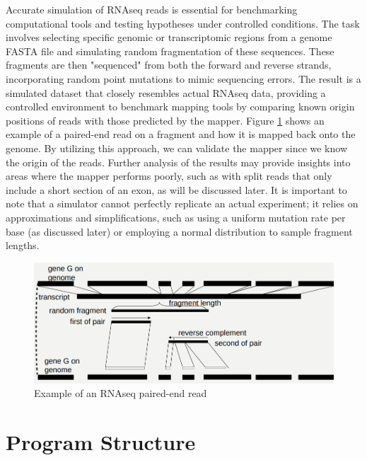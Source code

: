 \documentclass{article}
\begin{document}
    Accurate simulation of RNAseq reads is essential for benchmarking computational tools and testing hypotheses under controlled conditions. The task involves selecting specific genomic or transcriptomic regions from a genome FASTA file and simulating random fragmentation of these sequences. These fragments are then "sequenced" from both the forward and reverse strands, incorporating random point mutations to mimic sequencing errors. The result is a simulated dataset that closely resembles actual RNAseq data, providing a controlled environment to benchmark mapping tools by comparing known origin positions of reads with those predicted by the mapper. Figure \ref{fig:read-diagraml} shows an example of a paired-end read on a fragment and how it is mapped back onto the genome. By utilizing this approach, we can validate the mapper since we know the origin of the reads. Further analysis of the results may provide insights into areas where the mapper performs poorly, such as with split reads that only include a short section of an exon, as will be discussed later. It is important to note that a simulator cannot perfectly replicate an actual experiment; it relies on approximations and simplifications, such as using a uniform mutation rate per base (as discussed later) or employing a normal distribution to sample fragment lengths.

    \begin{figure}
        \centering
        \includegraphics[width=1.0\textwidth]{figures/readsimulator/readdiagram.png}
        \caption{Example of an RNAseq paired-end read}
        \label{fig:read-diagraml}
    \end{figure}


    \section{Program Structure}
\end{document}
